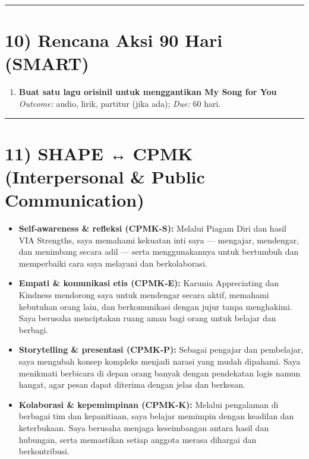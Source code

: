 \documentclass[
  letterpaper,
  DIV=11,
  numbers=noendperiod]{scrreprt}
\providecommand{\tightlist}{%
  \setlength{\itemsep}{0pt}\setlength{\parskip}{0pt}}\usepackage{longtable,booktabs,array}
\begin{document}
\begin{center}\rule{0.5\linewidth}{0.5pt}\end{center}

\section{10) Rencana Aksi 90 Hari
(SMART)}\label{rencana-aksi-90-hari-smart}

\begin{enumerate}
\def\labelenumi{\arabic{enumi}.}
\tightlist
\item
  \textbf{Buat satu lagu orisinil untuk menggantikan My Song for You}
  \emph{Outcome:} audio, lirik, partitur (jika ada); \emph{Due:} 60
  hari.
\end{enumerate}

\begin{center}\rule{0.5\linewidth}{0.5pt}\end{center}

\section{11) SHAPE ↔ CPMK (Interpersonal \& Public
Communication)}\label{shape-cpmk-interpersonal-public-communication}

\begin{itemize}
\tightlist
\item
  \textbf{Self‑awareness \& refleksi (CPMK‑S):} Melalui Piagam Diri dan
  hasil VIA Strengths, saya memahami kekuatan inti saya --- mengajar,
  mendengar, dan menimbang secara adil --- serta menggunakannya untuk
  bertumbuh dan memperbaiki cara saya melayani dan berkolaborasi.
\item
  \textbf{Empati \& komunikasi etis (CPMK‑E):} Karunia Appreciating dan
  Kindness mendorong saya untuk mendengar secara aktif, memahami
  kebutuhan orang lain, dan berkomunikasi dengan jujur tanpa menghakimi.
  Saya berusaha menciptakan ruang aman bagi orang untuk belajar dan
  berbagi.
\item
  \textbf{Storytelling \& presentasi (CPMK‑P):} Sebagai pengajar dan
  pembelajar, saya mengubah konsep kompleks menjadi narasi yang mudah
  dipahami. Saya menikmati berbicara di depan orang banyak dengan
  pendekatan logis namun hangat, agar pesan dapat diterima dengan jelas
  dan berkesan.
\item
  \textbf{Kolaborasi \& kepemimpinan (CPMK‑K):} Melalui pengalaman di
  berbagai tim dan kepanitiaan, saya belajar memimpin dengan keadilan
  dan keterbukaan. Saya berusaha menjaga keseimbangan antara hasil dan
  hubungan, serta memastikan setiap anggota merasa dihargai dan
  berkontribusi.
\end{itemize}
\end{document}
